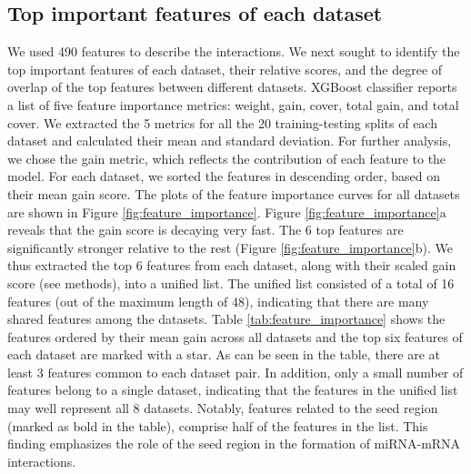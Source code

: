 \subsection{Top important features of each dataset}
We used 490 features to describe the interactions. We next sought to identify the top important features of each dataset, their relative scores, and the degree of overlap of the top features between different datasets. XGBoost classifier reports a list of five feature importance metrics: weight, gain, cover, total gain, and total cover. We extracted the 5 metrics for all the 20 training-testing splits of each dataset and calculated their mean and standard deviation. 
For further analysis, we chose the gain metric, which reflects the contribution of each feature to the model. For each dataset, we sorted the features in descending order, based on their mean gain score. The plots of the feature importance curves for all datasets are shown in Figure \ref{fig:feature_importance}.
Figure \ref{fig:feature_importance}a reveals that the gain score is decaying very fast. The 6 top features are significantly stronger relative to the rest (Figure \ref{fig:feature_importance}b). We thus extracted the top 6 features from each dataset, along with their scaled gain score (see methods), into a unified list. The unified list consisted of a total of 16 features (out of the maximum length of 48), indicating that there are many shared features among the datasets. Table \ref{tab:feature_importance} shows the features ordered by their mean gain across all datasets and the top six features of each dataset are marked with a star. As can be seen in the table, there are at least 3 features common to each dataset pair. In addition, only a small number of features belong to a single dataset, indicating that the features in the unified list may well represent all 8 datasets.
Notably, features related to the seed region (marked as bold in the table), comprise half of the features in the list. This finding emphasizes the role of the seed region in the formation of miRNA-mRNA interactions.


